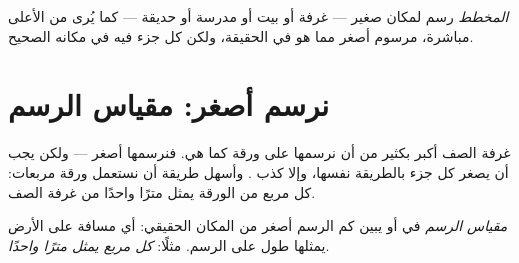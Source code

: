 \begin{definition}[المخطط]\label{def:g2:drawing-to-map:plan}
\emph{المخطط} رسم لمكان صغير --- غرفة أو بيت أو مدرسة أو
حديقة --- كما يُرى من الأعلى مباشرة، مرسوم أصغر مما هو في الحقيقة، ولكن
كل جزء فيه في مكانه الصحيح.
\end{definition}

\section{نرسم أصغر: مقياس الرسم}

غرفة الصف أكبر بكثير من أن نرسمها على ورقة كما هي. فنرسمها أصغر ---
ولكن يجب أن يصغر كل جزء بالطريقة نفسها، وإلا كذب . وأسهل طريقة
أن نستعمل ورقة مربعات: كل مربع من الورقة يمثل مترًا واحدًا من غرفة
الصف.

\begin{definition}\label{def:g2:drawing-to-map:scale}
\emph{مقياس الرسم} في  أو  يبين كم
الرسم أصغر من المكان الحقيقي: أي مسافة على الأرض يمثلها طول على
الرسم. مثلًا: \emph{كل مربع يمثل مترًا واحدًا}.
\end{definition}

